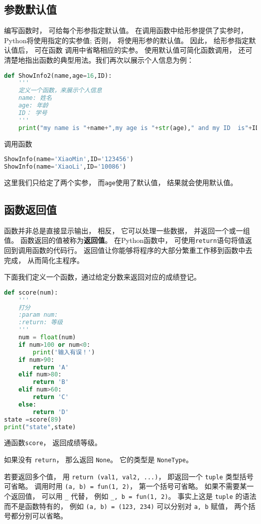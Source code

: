 \subsection{参数默认值}
编写函数时， 可给每个形参指定默认值。 在调用函数中给形参提供了实参时， Python将使用指定的实参值; 否则， 将使用形参的默认值。 因此， 给形参指定默认值后， 可在函数
调用中省略相应的实参。 使用默认值可简化函数调用， 还可清楚地指出函数的典型用法。我们再次以展示个人信息为例：
\begin{lstlisting}[language=python]
def ShowInfo2(name,age=16,ID):
    '''
    定义一个函数，来展示个人信息
    name: 姓名
    age: 年龄
    ID： 学号
    '''
    print("my name is "+name+",my age is "+str(age)," and my ID  is"+ID)
\end{lstlisting}
调用函数
\begin{lstlisting}[language=python]
ShowInfo(name='XiaoMin',ID='123456')
ShowInfo(name='XiaoLi',ID='10086')
\end{lstlisting}
这里我们只给定了两个实参， 而\verb|age|使用了默认值， 结果就会使用默认值。

\subsection{函数返回值}
函数并非总是直接显示输出， 相反， 它可以处理一些数据， 并返回一个或一组值。 函数返回的值被称为\textbf{返回值}。 在Python函数中， 可使用\verb|return|语句将值返回到调用函数的代码行。 返回值让你能够将程序的大部分繁重工作移到函数中去完成， 从而简化主程序。

下面我们定义一个函数，通过给定分数来返回对应的成绩登记。
\begin{lstlisting}[language=python]
def score(num):
    '''
    打分
    :param num:
    :return: 等级
    '''
    num = float(num)
    if num>100 or num<0:
        print('输入有误！')
    if num>90:
        return 'A'
    elif num>80:
        return 'B'
    elif num>60:
        return 'C'
    else:
        return 'D'
state =score(89)
print("state",state)
\end{lstlisting}
通函数\verb|score|， 返回成绩等级。

如果没有 \verb|return|， 那么返回 \verb|None|。 它的类型是 \verb|NoneType|。

若要返回多个值， 用 \verb|return (val1, val2, ...)|， 即返回一个 \verb|tuple| 类型括号可省略。 调用时用 \verb|(a, b) = fun(1, 2)|， 第一个括号可省略。 如果不需要某一个返回值， 可以用 \verb|_| 代替， 例如 \verb|_, b = fun(1, 2)|。 事实上这是 \verb|tuple| 的语法而不是函数特有的， 例如 \verb|(a, b) = (123, 234)| 可以分别对 \verb|a, b| 赋值， 两个括号都分别可以省略。

